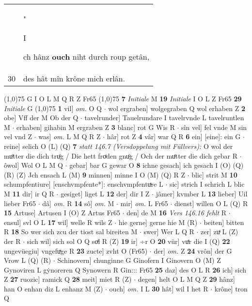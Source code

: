 \documentclass[8pt,a4paper,notitlepage]{article}
\begin{document}
\begin{table}[ht]
\begin{minipage}[t]{0.5\linewidth}
\begin{tabular}{rl}
 & "\begin{large}I\end{large}ch hânz \textbf{ouch} niht durch roup getân,\\ 
30 & des hât mîn krône mich erlân.\\ 
\end{tabular}
\scriptsize
\line(1,0){75} \newline
G I O L M Q R Z Fr65 \newline
\line(1,0){75} \newline
\textbf{7} \textit{Initiale} M  \textbf{19} \textit{Initiale} I O L Z Fr65  \textbf{29} \textit{Initiale} G  \newline
\line(1,0){75} \newline
\textbf{1} vil] \textit{om.} O Q  $\cdot$ wol ergraben] wolgegraben Q wol erhaben Z \textbf{2} obe] Vff der M Ob der Q  $\cdot$ tavelrunder] Tauelrundare I tavelrvnde L tavelruntlen M  $\cdot$ erhaben] gihabin M ergraben Z \textbf{3} blanc] rot G Wis R  $\cdot$ sîn vel] fel vnde M sin vel vnd Z  $\cdot$ was] \textit{om.} L M Q R Z  $\cdot$ hâr] rot Z \textbf{4} vâr] war Q R \textbf{6} ein] [eine]: ein G  $\cdot$ reine] selich O (L) (Q) \textbf{7} \textit{statt 146.7 (Versdoppelung mit Füllvers):} O wol der muͦtter die dich truͦg / Die hett froͯden gnuͦg / Och der muͦtter die dich gebar R   $\cdot$ ôwol] Wol O L M Q  $\cdot$ gebar] bar G gewar O \textbf{8} ichne gesach] ich gesach I (O) (Q) (R) (Z) Jch ensach L (M) \textbf{9} minnen] minne I O (M) (Q) R Z  $\cdot$ blic] strit M \textbf{10} schumpfentiure] [enschvmpfente*]: enschvmpfentuͯre L  $\cdot$ sic] strich I schrich L blic M \textbf{11} dir] ir Q R  $\cdot$ gesiget] liget L \textbf{12} der] dir I Z  $\cdot$ jâmer] kvmber L \textbf{13} lieber] Uil lieber Fr65  $\cdot$ dâ] \textit{om.} R \textbf{14} sô] \textit{om.} M  $\cdot$ mir] \textit{om.} L Fr65  $\cdot$ dienst] willen O L (Q) R \textbf{15} Artuse] Artusen I (O) Z Artus Fr65  $\cdot$ den] de M \textbf{16} \textit{Vers 146.16 fehlt} R   $\cdot$ ensul] svl O L \textbf{17} wil] welle R wils Z  $\cdot$ hie gerne] gerne hie M (R)  $\cdot$ beiten] bitten R \textbf{18} So wer sich zcu der tiost sal bireiten M  $\cdot$ swer] Wer L Q R  $\cdot$ zer] zuͯ L (Z) der R  $\cdot$ sich wil] sich sol O Q soͯl R (Z) \textbf{19} ir] ÷r O \textbf{20} vür] vuͤr die I (Q) \textbf{22} ungevüegiu] vngefuͯge R \textbf{23} zucte] zvht O (Fr65)  $\cdot$ der] \textit{om.} Z \textbf{24} vrôn] der G Vrow L (Q) (R)  $\cdot$ Schinovern] chunginne G Ginofern I Ginovern O (M) Z Gynoviren L gẏnoreren Q Synowern R Gin::: Fr65 \textbf{25} daz] des O L R \textbf{26} ich] sich Z \textbf{27} ruozic] ramick Q \textbf{28} meit] miet R (Z)  $\cdot$ degen] helt O L M Q Z \textbf{29} hânz] han O enhan diz L enhanz M (Z)  $\cdot$ ouch] \textit{om.} I L \textbf{30} hât] wil I het R  $\cdot$ krône] tron Q \newline

\end{minipage}
\end{table}
\end{document}
